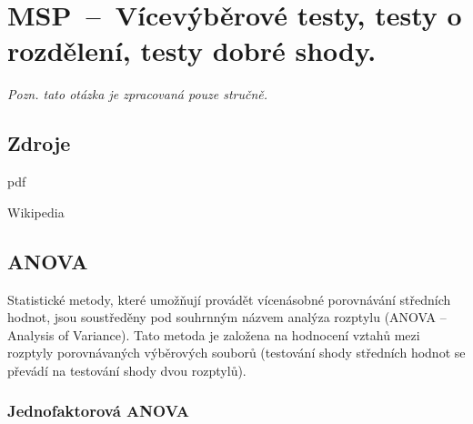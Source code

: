 

\graphicspath{{msp/testy/figures}}


\chapter{MSP~--~Vícevýběrové testy, testy o rozdělení, testy dobré shody.}


\textit{Pozn. tato otázka je zpracovaná pouze stručně.}

\section{Zdroje}

\begin{compactitem}
    \item {}pdf
    \item {}
    \item {}
    \item Wikipedia
\end{compactitem}


\section{ANOVA}

Statistické metody, které umožňují provádět vícenásobné porovnávání středních hodnot, jsou soustředěny pod souhrnným názvem analýza rozptylu (ANOVA -- Analysis of Variance). Tato metoda je založena na hodnocení vztahů mezi rozptyly porovnávaných výběrových souborů (testování shody středních hodnot se převádí na testování shody dvou rozptylů).

\subsection{Jednofaktorová ANOVA}

